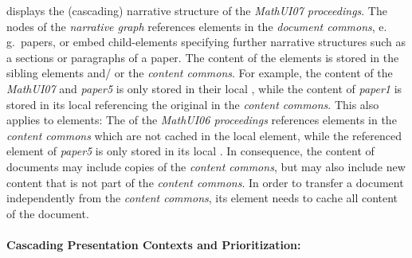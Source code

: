 \documentclass[a4paper]{article}
\begin{document}
 displays the (cascading) narrative structure of the
{\emph{MathUI07 proceedings}}. The nodes of the {\emph{narrative graph}} references
{} elements in the {\emph{document commons}}, e.\,g.\ papers, or embed
{} child-elements specifying further narrative structures such as a
sections or paragraphs of a paper. The content of the {} elements is stored
in the sibling {} elements and/ or the {\emph{content commons}}. For
example, the content of the {\emph{MathUI07}} and {\emph{paper5}} is only stored in their
local {}, while the content of {\emph{paper1}} is stored in its local
{} referencing the original {\infom} in the {\emph{content commons}}.
This also applies to {} elements: The {} of the
{\emph{MathUI06 proceedings}} references {} elements in the
{\emph{content commons}} which are not cached in the local {} element,
while the referenced {} element of {\emph{paper5}} is only stored in
its local {}. In consequence, the content of documents may include copies
of the {\emph{content commons}}, but may also include new content that is not part of the
{\emph{content commons}}. In order to transfer a document independently from the
{\emph{content commons}}, its {} element needs to cache all content of
the document.


\paragraph{Cascading Presentation Contexts and Prioritization:}
\end{document}
